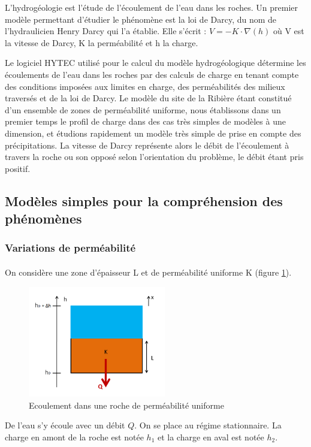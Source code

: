 \documentclass{article}
\begin{document}
L’hydrogéologie est l’étude de l’écoulement de l’eau dans les roches. Un premier modèle permettant d’étudier le phénomène est la loi de Darcy, du nom de l’hydraulicien Henry Darcy qui l’a établie. Elle s’écrit : $V = - K\cdot \nabla(h)$ où V est la vitesse de Darcy, K la perméabilité et h la charge. %

Le logiciel HYTEC utilisé pour le calcul du modèle hydrogéologique détermine les écoulements de l’eau dans les roches par des calculs de charge en tenant compte des conditions imposées aux limites en charge, des perméabilités des milieux traversés et de la loi de Darcy. Le modèle du site de la Ribière étant constitué d’un ensemble de zones de perméabilité uniforme, nous établissons dans un premier temps le profil de charge dans des cas très simples de modèles à une dimension, et étudions rapidement un modèle très simple de prise en compte des précipitations. La vitesse de Darcy représente alors le débit de l’écoulement à travers la roche ou son opposé selon l'orientation du problème, le débit étant pris positif. 
\subsection{Modèles simples pour la compréhension des phénomènes}
\subsubsection{Variations de perméabilité}
\paragraph{} On considère une zone d’épaisseur L et de perméabilité uniforme K (figure \ref{fig:ecoulement_permea_uniforme}).

\begin{figure}[H]
    \centering
    \includegraphics[width=6cm]{A_III_B_1.png}
    \caption{Ecoulement dans une roche de perméabilité uniforme}
    \label{fig:ecoulement_permea_uniforme}
\end{figure}
De l’eau s’y écoule avec un débit $Q$. On se place au régime stationnaire. La charge en amont de la roche est notée $h_1$ et la charge en aval est notée $h_2$.
\end{document}
